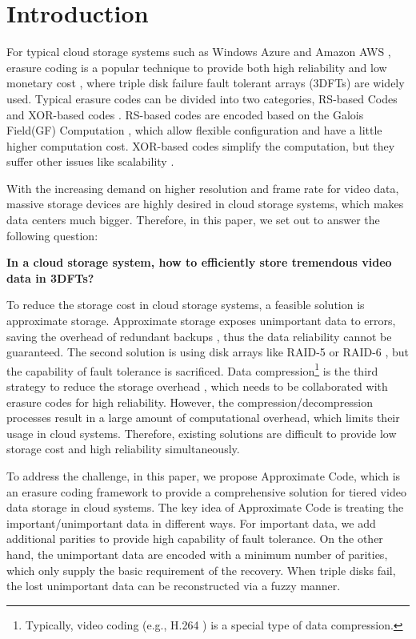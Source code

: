 \documentclass[sigconf]{acmart}
\begin{document}
\thispagestyle{fancy} 
\pagestyle{fancy}
\cfoot{\thepage}

\section{Introduction}
For typical cloud storage systems such as Windows Azure \cite{calder2011windows} and Amazon AWS \cite{bermudez2013exploring}, erasure coding is a popular technique to provide both high reliability and low monetary cost \cite{EVENODD, RDP, BlaumRoth, XCode, CRS, TripleStar, TPtech, RSL}, where triple disk failure fault tolerant arrays (3DFTs) are widely used. Typical erasure codes can be divided into two categories, RS-based Codes \cite{RS} \cite{LRC} and XOR-based codes \cite{EVENODD, hcode, STAR, tip}. RS-based codes are encoded based on the Galois Field(GF) Computation \cite{RS}, which allow flexible configuration and have a little higher computation cost. XOR-based codes simplify the computation, but they suffer other issues like scalability \cite{wu2012sdm, jiang2016bdr}.

With the increasing demand on higher resolution and frame rate for video data, massive storage devices are highly desired in cloud storage systems, which makes data centers much bigger.
Therefore, in this paper, we set out to answer the following question:

\textbf{In a cloud storage system, how to efficiently store tremendous video data in 3DFTs?}

To reduce the storage cost in cloud storage systems, a feasible solution is approximate storage. Approximate storage exposes unimportant data to errors, saving the overhead of redundant backups \cite{niklaus2018context, sampson2014approximate} , thus the data reliability cannot be guaranteed.
The second solution is using disk arrays like RAID-5 or RAID-6 \cite{RAID}, but the capability of fault tolerance is sacrificed.
Data compression\footnote{Typically, video coding (e.g., H.264 \cite{wiegand2003overview}) is a special type of data compression.}
is the third strategy to reduce the storage overhead \cite{ziv1977universal, ziv1978compression, deutsch1996deflate}, which needs to be collaborated with erasure codes for high reliability. However, the compression/decompression processes result in a large amount of computational overhead, which limits their usage in cloud systems. 
Therefore, existing solutions are difficult to provide low storage cost and high reliability simultaneously.

To address the challenge, in this paper, we propose Approximate Code, which is an erasure coding framework to provide a comprehensive solution for tiered video data storage in cloud systems. The key idea of Approximate Code is treating the important/unimportant data in different ways. For important data, we add additional parities to provide high capability of fault tolerance. On the other hand, the unimportant data are encoded with a minimum number of parities, which only supply the basic requirement of the recovery. When triple disks fail, the lost unimportant data can be reconstructed via a fuzzy manner.
\end{document}
